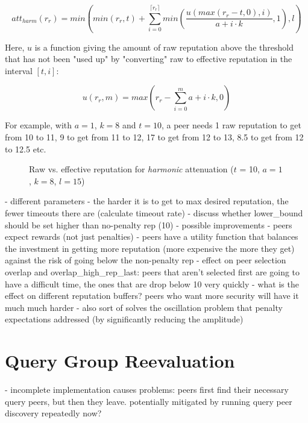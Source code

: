 \[att_{harm}(r_r) = min(min(r_r, t) + \sum_{i=0}^{\lceil r_r
\rceil}{min(\frac{u(max(r_r - t, 0), i)}{a + i \cdot k}, 1)}, l)\]

Here, $u$ is a function giving the amount of raw reputation above the threshold
that has not been "used up" by "converting" raw to effective reputation in the
interval $[t, i]$:

\[u(r_r, m) = max(r_r - \sum_{i=0}^m{a + i \cdot k}, 0)\]

For example, with $a = 1$, $k = 8$ and $t = 10$, a peer needs 1 raw reputation
to get from 10 to 11, 9 to get from 11 to 12, 17 to get from 12 to 13, 8.5 to
get from 12 to 12.5 etc.

\begin{figure}[t]
\centering
{}
\caption{Raw vs. effective reputation for \emph{harmonic} attenuation ($t$ = 10,
$a = 1$, $k = 8$, $l = 15$)}
\label{fig:att_harm_raw_vs_eff}
\end{figure}

- different parameters
- the harder it is to get to max desired reputation, the fewer timeouts there
  are (calculate timeout rate)
- discuss whether lower\_bound should be set higher than no-penalty rep (10)
- possible improvements
    - peers expect rewards (not just penalties)
    - peers have a utility function that balances the investment in getting more
      reputation (more expensive the more they get) against the risk of going
      below the non-penalty rep
- effect on peer selection overlap and overlap\_high\_rep\_last: peers that
  aren't selected first are going to have a difficult time, the ones that are
  drop below 10 very quickly
- what is the effect on different reputation buffers? peers who want more
  security will have it much much harder
- also sort of solves the oscillation problem that penalty expectations
  addressed (by significantly reducing the amplitude)

\section{Query Group Reevaluation}
- incomplete implementation causes problems: peers first find their necessary
  query peers, but then they leave. potentially mitigated by running query peer
  discovery repeatedly now?

